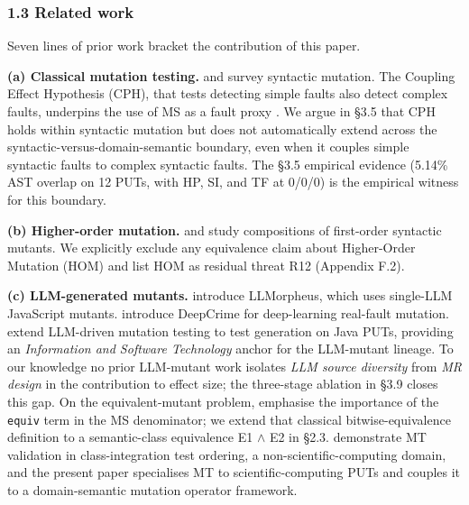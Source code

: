 \documentclass[review,12pt,authoryear]{elsarticle}
\begin{document}
\subsubsection{1.3 Related work}\label{related-work-and-roadmap}

Seven lines of prior work bracket the contribution of this paper.

\textbf{(a) Classical mutation testing.} \citet{d7c38286734419b52de4262c9802ebdfcf4b9447} and
\citet{d461ab9482b7fb5eadd7e6cd2c6dffced8ede8b8} survey syntactic mutation. The Coupling Effect
Hypothesis (CPH), that tests detecting simple faults also detect complex
faults, underpins the use of MS as a fault proxy \citep{91b1f655c6e42c02eed722b213e3c03df2e2d75a,andrews2005mutation,just2014mutants}. We
argue in §3.5 that CPH holds within syntactic mutation but does not
automatically extend across the syntactic-versus-domain-semantic
boundary, even when it couples simple syntactic faults to complex
syntactic faults. The §3.5 empirical evidence (5.14\% AST overlap on 12
PUTs, with HP, SI, and TF at 0/0/0) is the empirical witness for this
boundary.

\textbf{(b) Higher-order mutation.} \citet{c03829bdd1a6e45113092384bf0fa05a064ca54a} and \citet{kintis2018effective}
study compositions of first-order syntactic mutants. We
explicitly exclude any equivalence claim about Higher-Order Mutation
(HOM) and list HOM as residual threat R12 (Appendix F.2).

\textbf{(c) LLM-generated mutants.} \citet{tip2025llmorpheus}
introduce LLMorpheus, which uses single-LLM JavaScript mutants.
\citet{humbatova2021deepcrime} introduce DeepCrime for
deep-learning real-fault mutation. \citet{dakhel2024llm} extend
LLM-driven mutation testing to test generation on Java PUTs, providing
an \emph{Information and Software Technology} anchor for the LLM-mutant
lineage. To our knowledge no prior LLM-mutant work isolates \emph{LLM
source diversity} from \emph{MR design} in the contribution to effect
size; the three-stage ablation in §3.9 closes this gap. On the
equivalent-mutant problem, \citet{delgadoperez2020equivalent} emphasise
the importance of the \texttt{equiv} term in the MS denominator; we
extend that classical bitwise-equivalence definition to a semantic-class
equivalence E1 $\wedge$ E2 in §2.3. \citet{zhang2021classintegration} demonstrate MT
validation in class-integration test ordering, a
non-scientific-computing domain, and the present paper specialises MT to
scientific-computing PUTs and couples it to a domain-semantic mutation
operator framework.
\end{document}
